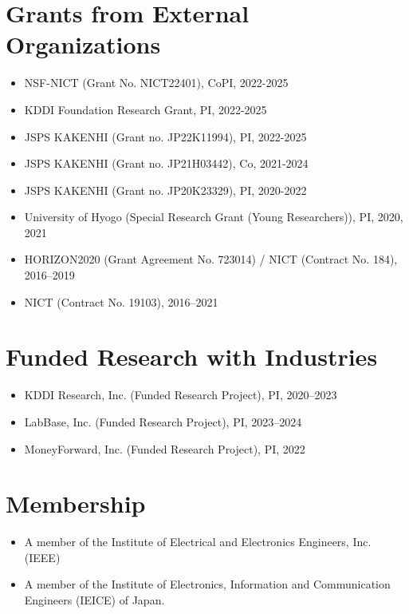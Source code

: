 \section*{Grants from External Organizations}
\begin{itemize}
 \item NSF-NICT (Grant No. NICT22401), CoPI, 2022-2025
 \item KDDI Foundation Research Grant, PI, 2022-2025
 \item JSPS KAKENHI (Grant no. JP22K11994), PI, 2022-2025
 \item JSPS KAKENHI (Grant no. JP21H03442), Co, 2021-2024
 \item JSPS KAKENHI (Grant no. JP20K23329), PI, 2020-2022
 \item University of Hyogo (Special Research Grant (Young Researchers)), PI, 2020, 2021
 \item HORIZON2020 (Grant Agreement No. 723014) / NICT (Contract No. 184), 2016--2019
 \item NICT (Contract No. 19103), 2016--2021
\end{itemize}

\section*{Funded Research with Industries}
\begin{itemize}
 \item KDDI Research, Inc. (Funded Research Project), PI, 2020--2023
 \item LabBase, Inc. (Funded Research Project), PI, 2023--2024
 \item MoneyForward, Inc. (Funded Research Project), PI, 2022
\end{itemize}



\section*{Membership}
\begin{itemize}
\item A member of the Institute of Electrical and Electronics Engineers, Inc. (IEEE)
\item A member of the Institute of Electronics, Information and Communication Engineers
(IEICE) of Japan.
\end{itemize}


